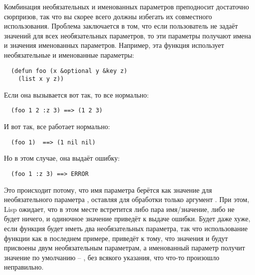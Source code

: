 Комбинация необязательных и именованных параметров преподносит достаточно сюрпризов, так
что вы скорее всего должны избегать их совместного использования.  Проблема заключается в
том, что если пользователь не задаёт значений для всех необязательных параметров, то эти
параметры получают имена и значения именованных параметров.  Например, эта функция
использует необязательные и именованные параметры:

\begin{lstlisting}
  (defun foo (x &optional y &key z) 
    (list x y z))
\end{lstlisting}

Если она вызывается вот так, то все нормально:

\begin{verbatim}
  (foo 1 2 :z 3) ==> (1 2 3)
\end{verbatim}

И вот так, все работает нормально:

\begin{verbatim}
  (foo 1)  ==> (1 nil nil)
\end{verbatim}

Но в этом случае, она выдаёт ошибку:

\begin{verbatim}
  (foo 1 :z 3) ==> ERROR
\end{verbatim}

Это происходит потому, что имя параметра  берётся как значение для
необязательного параметра , оставляя для обработки только аргумент .  При
этом, Lisp ожидает, что в этом месте встретится либо пара имя/значение, либо не будет
ничего, и одиночное значение приведёт к выдаче ошибки.  Будет даже хуже, если функция
будет иметь два необязательных параметра, так что использование функции как в последнем
примере, приведёт к тому, что значения  и  будут присвоены двум
необязательным параметрам, а именованный параметр  получит значение по умолчанию
-- , без всякого указания, что что-то произошло неправильно.

